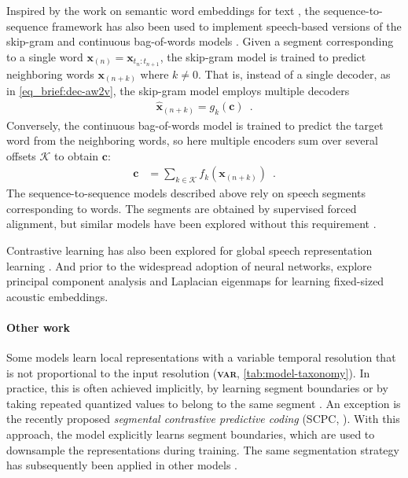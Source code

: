 {Inspired by the work on semantic word embeddings for text \parencite{mikolov_distributed_2013}, the sequence-to-sequence framework has also been used to implement speech-based versions of the skip-gram and continuous bag-of-words models \parencite{chung_learning_2017, chung_speech2vec_2018}. Given a segment corresponding to a single word $\mathbf{x}_{(n)} = \mathbf{x}_{t_{n}:t_{n+1}}$, the skip-gram model is trained to predict neighboring words $\mathbf{x}_{(n + k)}$ where $k\ne0$. That is, instead of a single decoder, as in \cref{eq_brief:dec-aw2v}, the skip-gram model employs multiple decoders
%
\begin{align}
    \hat{\mathbf{x}}_{(n + k)} = g_k(\mathbf{c}) \enspace .
\end{align}
%
Conversely, the continuous bag-of-words model is trained to predict the target word from the neighboring words, so here multiple encoders sum over several offsets $\mathcal{K}$ to obtain $\mathbf{c}$:
%
\begin{align}
    \mathbf{c} &= \sum_{k\in\mathcal{K}} f_k(\mathbf{x}_{(n + k)}) \enspace .
\end{align}
The sequence-to-sequence models described above rely on speech segments corresponding to words. The segments are obtained by supervised forced alignment, but similar models have been explored without this requirement \parencite{jati_speaker2vec_2017, tagliasacchi_pretraining_2020}.

Contrastive learning has also been explored for global speech representation learning \parencite{milde_unspeech_2018, jati_neural_2019, jansen_unsupervised_2018}. And prior to the widespread adoption of neural networks, \textcite{levin_fixeddimensional_2013} explore principal component analysis and Laplacian eigenmaps for learning fixed-sized acoustic embeddings.

\paragraph{Other work}
Some models learn local representations with a variable temporal resolution that is not proportional to the input resolution (\textbf{\textsc{var}}, \cref{tab:model-taxonomy}). In practice, this is often achieved implicitly, by learning segment boundaries or by taking repeated quantized values to belong to the same segment \parencite{kamper_unsupervised_2021, chorowski_unsupervised_2019, michel_blind_2017, kreuk_selfsupervised_2020, wang_gate_2017, dieleman_variablerate_2021}. An exception is the recently proposed \emph{segmental contrastive predictive coding} (SCPC, \citealp{bhati_segmental_2021, bhati_unsupervised_2022}). With this approach, the model explicitly learns segment boundaries, which are used to downsample the representations during training. The same segmentation strategy has subsequently been applied in other models \parencite{cuervo_contrastive_2022}.

}
